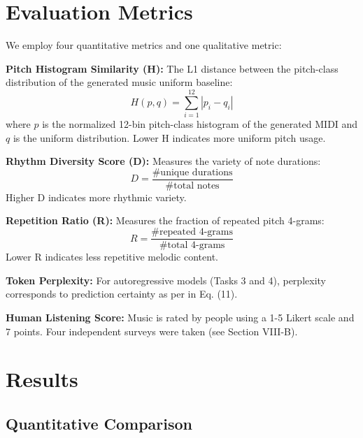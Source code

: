 \documentclass[conference]{IEEEtran}
\begin{document}
\section{Evaluation Metrics}

We employ four quantitative metrics and one qualitative metric:

\textbf{Pitch Histogram Similarity (H):}  The L1 distance between the pitch-class distribution of the generated music uniform baseline: 
\begin{equation}
H(p, q) = \sum_{i=1}^{12} |p_i - q_i|
\end{equation}
where $p$ is the normalized 12-bin pitch-class histogram of the generated MIDI and $q$ is the uniform distribution. Lower H indicates more uniform pitch usage.

\textbf{Rhythm Diversity Score (D):} Measures the variety of note durations:
\begin{equation}
D = \frac{\text{\# unique durations}}{\text{\# total notes}}
\end{equation}
Higher D indicates more rhythmic variety.

\textbf{Repetition Ratio (R):} Measures the fraction of repeated pitch 4-grams:
\begin{equation}
R = \frac{\text{\# repeated 4-grams}}{\text{\# total 4-grams}}
\end{equation}
Lower R indicates less repetitive melodic content.

\textbf{Token Perplexity:} For autoregressive models (Tasks 3 and 4), perplexity corresponds to prediction certainty as per in Eq. (11).

\textbf{Human Listening Score:}  Music is rated by people using a 1-5 Likert scale and 7 points. Four
independent surveys were taken (see Section VIII-B).

\section{Results}

\subsection{Quantitative Comparison}
\end{document}
